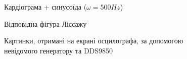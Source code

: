 \begin{figure}[h]
\begin{minipage}[h]{0.47\linewidth}
	\end{minipage}
	\vfill
	\begin{minipage}[h]{0.47\linewidth}
		 Кардіограма + синусоїда ($\omega = 500Hz$)\\
	\end{minipage}
	\hfill
	\begin{minipage}[h]{0.47\linewidth}
		 Відповідна фігура Ліссажу \\
	\end{minipage}
	\caption{Картинки, отримані на екрані осцилографа, за допомогою невідомого генератору та DDS9850}
	\label{fig:part22}
\end{figure}

